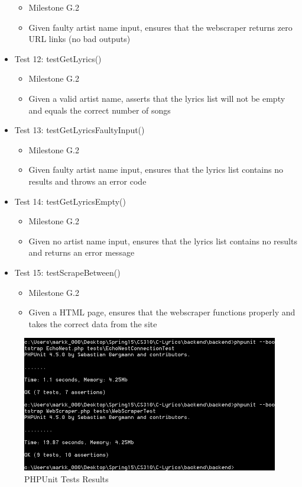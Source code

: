 \documentclass[]{article}
\begin{document}
\begin{itemize}
  \begin{itemize}
  \itemsep1pt\parskip0pt
  \item
    Milestone G.2
  \item
    Given faulty artist name input, ensures that the webscraper returns
    zero URL links (no bad outputs)
  \end{itemize}
\item
  Test 12: testGetLyrics()

  \begin{itemize}
  \itemsep1pt\parskip0pt
  \item
    Milestone G.2
  \item
    Given a valid artist name, asserts that the lyrics list will not be
    empty and equals the correct number of songs
  \end{itemize}
\item
  Test 13: testGetLyricsFaultyInput()

  \begin{itemize}
  \itemsep1pt\parskip0pt
  \item
    Milestone G.2
  \item
    Given faulty artist name input, ensures that the lyrics list
    contains no results and throws an error code
  \end{itemize}
\item
  Test 14: testGetLyricsEmpty()

  \begin{itemize}
  \itemsep1pt\parskip0pt
  \item
    Milestone G.2
  \item
    Given no artist name input, ensures that the lyrics list contains no
    results and returns an error message
  \end{itemize}
\item
  Test 15: testScrapeBetween()

  \begin{itemize}
  \itemsep1pt\parskip0pt
  \item
    Milestone G.2
  \item
    Given a HTML page, ensures that the webscraper functions properly
    and takes the correct data from the site
  \end{itemize}
\end{itemize}


\begin{figure}[htbp]
\centering
\includegraphics{phpunit.png}
\caption{PHPUnit Tests Results}
\end{figure}
\end{document}
